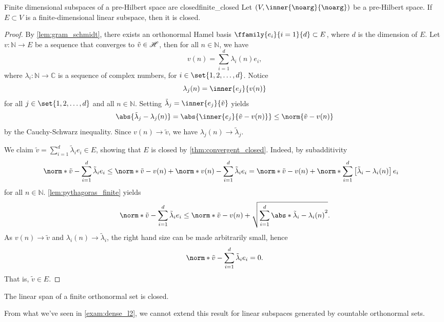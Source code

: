\begin{proposition}{Finite dimensional subspaces of a pre-Hilbert space are closed}{finite_closed}
    Let \((V, \inner{\noarg}{\noarg})\) be a pre-Hilbert space. If \(E \subset V\) is a finite-dimensional linear subspace, then it is closed.
\end{proposition}
\begin{proof}
    By \cref{lem:gram_schmidt}, there exists an orthonormal Hamel basis \(\ffamily{e_i}{i=1}{d} \subset E\), where \(d\) is the dimension of \(E\). Let \(v : \mathbb{N} \to E\) be a sequence that converges to \(\tilde{v} \in \mathscr{H}\), then for all \(n \in \mathbb{N}\), we have
    \begin{equation*}
        v(n) = \sum_{i = 1}^{d} \lambda_i(n) e_i,
    \end{equation*}
    where \(\lambda_i : \mathbb{N} \to \mathbb{C}\) is a sequence of complex numbers, for \(i \in\set{1,2,\dots, d}\). Notice
    \begin{equation*}
        \lambda_j(n) = \inner{e_j}{v(n)}
    \end{equation*}
    for all \(j \in \set{1,2,\dots,d}\) and all \(n \in \mathbb{N}\). Setting \(\tilde{\lambda}_j = \inner{e_j}{\tilde{v}}\) yields
    \begin{equation*}
        \abs{\tilde{\lambda}_j - \lambda_j(n)} = \abs{\inner{e_j}{\tilde{v} - v(n)}} \leq \norm{\tilde{v} - v(n)}
    \end{equation*}
    by the Cauchy-Schwarz inequality. Since \(v(n) \to \tilde{v}\), we have \(\lambda_j(n) \to \tilde{\lambda}_j\).

    We claim \(\tilde{v} = \sum_{i=1}^d \tilde{\lambda}_i e_i \in E\), showing that \(E\) is closed by \cref{thm:convergent_closed}. Indeed, by subadditivity
    \begin{align*}
        \norm*{\tilde{v} - \sum_{i=1}^d \tilde{\lambda}_i e_i} &\leq \norm*{\tilde{v} - v(n)} + \norm*{v(n) - \sum_{i=1}^d \tilde{\lambda}_i e_i} = \norm*{\tilde{v} - v(n)} + \norm*{\sum_{i=1}^d \left[\tilde{\lambda}_i - \lambda_i(n)\right]e_i}
    \end{align*}
    for all \(n \in \mathbb{N}\). \cref{lem:pythagoras_finite} yields
    \begin{equation*}
        \norm*{\tilde{v} - \sum_{i=1}^d \tilde{\lambda}_i e_i} \leq \norm*{\tilde{v} - v(n)} + \sqrt{\sum_{i=1}^d \abs*{\tilde{\lambda}_i - \lambda_i(n)}^2}.
    \end{equation*}
    As \(v(n) \to \tilde{v}\) and \(\lambda_i(n) \to \tilde{\lambda}_i\), the right hand size can be made arbitrarily small, hence
    \begin{equation*}
        \norm*{\tilde{v} - \sum_{i=1}^d \tilde{\lambda}_ie_i} = 0.
    \end{equation*}
    That is, \(\tilde{v} \in E\).
\end{proof}
\begin{corollary}
    The linear span of a finite orthonormal set is closed.
\end{corollary}
\begin{remark}
    From what we've seen in \cref{exam:dense_l2}, we cannot extend this result for linear subspaces generated by countable orthonormal sets.
\end{remark}

